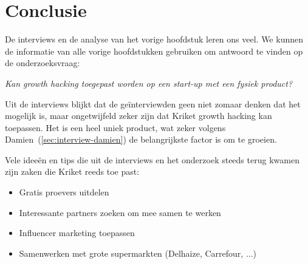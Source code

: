 
\chapter{Conclusie}
\label{ch:conclusie}


De interviews en de analyse van het vorige hoofdstuk leren ons veel. We kunnen de informatie van alle vorige hoofdstukken gebruiken om antwoord te vinden op de onderzoeksvraag:

\emph{Kan growth hacking toegepast worden op een start-up met een fysiek product?}

Uit de interviews blijkt dat de geïnterviewden geen niet zomaar denken dat het mogelijk is, maar ongetwijfeld zeker zijn dat Kriket growth hacking kan toepassen. Het is een heel uniek product, wat zeker volgens Damien~(\ref{sec:interview-damien}) de belangrijkste factor is om te groeien. 

Vele ideeën en tips die uit de interviews en het onderzoek steeds terug kwamen zijn zaken die Kriket reeds toe past:
\begin{itemize}
	\item Gratis proevers uitdelen
	\item Interessante partners zoeken om mee samen te werken
	\item Influencer marketing toepassen
	\item Samenwerken met grote supermarkten (Delhaize, Carrefour, ...)
\end{itemize}

